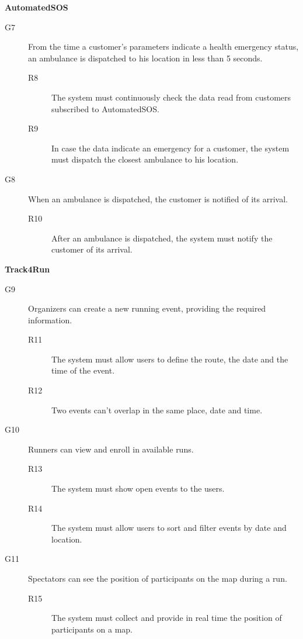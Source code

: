 \documentclass[../main.tex]{subfiles}
\begin{document}
\begin{minipage}{\textwidth}
{\bf AutomatedSOS}
\begin{description}
	\item [G7]  From the time a customer's parameters indicate a health emergency status, an ambulance is dispatched to his location in less than 5 seconds.
	\begin{description}
		\item [R8] The system must continuously check the data read from customers subscribed to AutomatedSOS.
		\item [R9] In case the data indicate an emergency for a customer, the system must dispatch the closest ambulance to his location.
	\end{description}

	\item [G8]  When an ambulance is dispatched, the customer is notified of its arrival.
	\begin{description}
		\item [R10] After an ambulance is dispatched, the system must notify the customer of its arrival.
	\end{description}
\end{description}
\end{minipage}
\vspace{8mm}


\begin{minipage}{\textwidth}
{\bf Track4Run}
\begin{description}
	\item [G9]  Organizers can create a new running event, providing the required information.
	\begin{description}
		\item [R11] The system must allow users to define the route, the date and the time of the event.
		\item [R12] Two events can't overlap in the same place, date and time.
	\end{description}

	\item [G10]  Runners can view and enroll in available runs.
	\begin{description}
		\item [R13] The system must show open events to the users.
		\item [R14] The system must allow users to sort and filter events by date and location.
	\end{description}

	\item [G11] Spectators can see the position of participants on the map during a run.
	\begin{description}
		\item [R15] The system must collect and provide in real time the position of participants on a map.
	\end{description}
\end{description}
\end{minipage}
\vspace{8mm}
\end{document}

